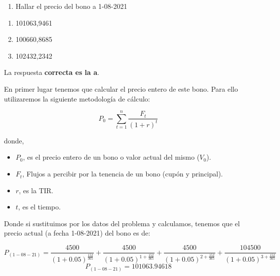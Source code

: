 \documentclass[
  letterpaper,
  DIV=11,
  numbers=noendperiod]{scrartcl}
\providecommand{\tightlist}{%
  \setlength{\itemsep}{0pt}\setlength{\parskip}{0pt}}\usepackage{longtable,booktabs,array}
\begin{document}
\begin{enumerate}
\def\labelenumi{\arabic{enumi}.}
\tightlist
\item
  Hallar el precio del bono a 1-08-2021
\end{enumerate}

\begin{enumerate}
\def\labelenumi{\alph{enumi}.}
\item
  101063,9461
\item
  100660,8685
\item
  102432,2342
\end{enumerate}

\begin{tcolorbox}[enhanced jigsaw, colframe=quarto-callout-tip-color-frame, opacityback=0, opacitybacktitle=0.6, colback=white, leftrule=.75mm, bottomtitle=1mm, colbacktitle=quarto-callout-tip-color!10!white, coltitle=black, toprule=.15mm, left=2mm, breakable, toptitle=1mm, titlerule=0mm, title=\textcolor{quarto-callout-tip-color}{\faLightbulb}\hspace{0.5em}{Solución}, arc=.35mm, rightrule=.15mm, bottomrule=.15mm]

La respuesta \textbf{correcta es la a}.

En primer lugar tenemos que calcular el precio entero de este bono. Para
ello utilizaremos la siguiente metodología de cálculo:

\[P_0=\sum_{ t=1}^{ n}\frac{F_t}{(1+r)^{t}}\]

donde,

\begin{itemize}
\item
  \(P_0\), es el precio entero de un bono o valor actual del mismo
  (\(V_0\)).
\item
  \(F_t\), Flujos a percibir por la tenencia de un bono (cupón y
  principal).
\item
  \(r\), es la TIR.
\item
  \(t\), es el tiempo.
\end{itemize}

Donde si sustituimos por los datos del problema y calculamos, tenemos
que el precio actual (a fecha 1-08-2021) del bono es de:

\[P_{(1-08-21)}=\frac{4500}{\left(1+0.05\right)^{\frac{152}{365}}}+\frac{4500}{\left(1+0.05\right)^{1+\frac{152}{365}}}+\frac{4500}{\left(1+0.05\right)^{2+\frac{152}{365}}}+\frac{104500}{\left(1+0.05\right)^{3+\frac{152}{365}}}\]
\[P_{(1-08-21)}=101063.94618\]

\end{tcolorbox}
\end{document}
